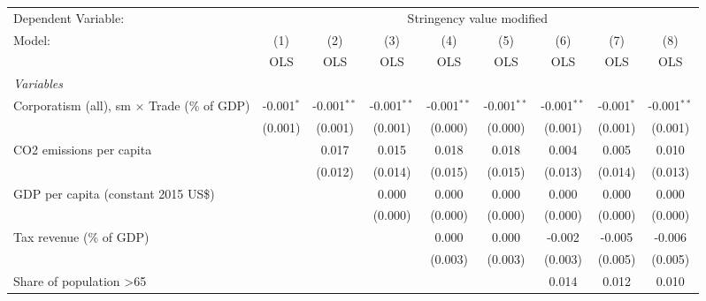 
\begingroup
\centering
\begin{tabular}{lcccccccc}
   \toprule
   Dependent Variable: & \multicolumn{8}{c}{Stringency value modified}\\
   Model:                                             & (1)          & (2)           & (3)           & (4)           & (5)           & (6)           & (7)          & (8)\\  
                                                      &  OLS         & OLS           & OLS           & OLS           & OLS           & OLS           & OLS          & OLS\\  
   \midrule
   \emph{Variables}\\
   Corporatism (all), sm $\times$ Trade (\% of GDP)   & -0.001$^{*}$ & -0.001$^{**}$ & -0.001$^{**}$ & -0.001$^{**}$ & -0.001$^{**}$ & -0.001$^{**}$ & -0.001$^{*}$ & -0.001$^{**}$\\   
                                                      & (0.001)      & (0.001)       & (0.001)       & (0.000)       & (0.000)       & (0.001)       & (0.001)      & (0.001)\\   
   CO2 emissions per capita                           &              & 0.017         & 0.015         & 0.018         & 0.018         & 0.004         & 0.005        & 0.010\\   
                                                      &              & (0.012)       & (0.014)       & (0.015)       & (0.015)       & (0.013)       & (0.014)      & (0.013)\\   
   GDP per capita (constant 2015 US\$)                &              &               & 0.000         & 0.000         & 0.000         & 0.000         & 0.000        & 0.000\\   
                                                      &              &               & (0.000)       & (0.000)       & (0.000)       & (0.000)       & (0.000)      & (0.000)\\   
   Tax revenue (\% of GDP)                            &              &               &               & 0.000         & 0.000         & -0.002        & -0.005       & -0.006\\   
                                                      &              &               &               & (0.003)       & (0.003)       & (0.003)       & (0.005)      & (0.005)\\   
   Share of population >65                            &              &               &               &               &               & 0.014         & 0.012        & 0.010\\   

\end{tabular}
